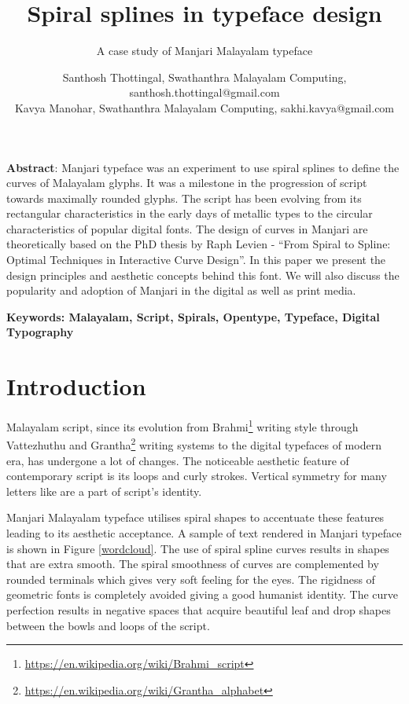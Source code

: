 \documentclass[11pt,twoside,a4paper,parskip=half]{scrartcl}
\title{Spiral splines in typeface design}
\subtitle{A case study of Manjari Malayalam typeface}
\author{%
Santhosh Thottingal, Swathanthra Malayalam Computing, santhosh.thottingal@gmail.com\\
Kavya Manohar, Swathanthra Malayalam Computing, sakhi.kavya@gmail.com
}
\begin{document}
\maketitle

\textbf{Abstract}: Manjari typeface was an experiment to use spiral splines to define the curves of Malayalam glyphs. It was a milestone in the progression of script towards maximally rounded glyphs. The script has been evolving from its rectangular characteristics in the early days of metallic types to the circular characteristics of popular digital fonts. The design of curves in Manjari are theoretically based on the PhD thesis by Raph Levien - ``From Spiral to Spline: Optimal Techniques in Interactive Curve Design”. In this paper we present the design principles and aesthetic concepts behind this font. We will also discuss the popularity and adoption of Manjari in the digital as well as print media.

\textbf{Keywords: Malayalam, Script, Spirals, Opentype, Typeface, Digital Typography}

\section{Introduction}

Malayalam script, since its evolution from Brahmi\footnote{\url{https://en.wikipedia.org/wiki/Brahmi_script}} writing style through Vattezhuthu and Grantha\footnote{\url{https://en.wikipedia.org/wiki/Grantha_alphabet}} writing systems to the digital typefaces of modern era, has undergone a lot of changes. The noticeable aesthetic feature of contemporary script is its loops and curly strokes. Vertical symmetry for many letters like {} are a part of script's identity. 

Manjari Malayalam typeface utilises spiral shapes to accentuate these features leading to its aesthetic acceptance. A sample of text rendered in Manjari typeface is shown in Figure \ref{wordcloud}. The use of spiral spline curves results in shapes that are extra smooth. The spiral smoothness of curves are complemented by rounded terminals which gives very soft feeling for the eyes. The rigidness of geometric fonts is completely avoided giving a good humanist identity. The curve perfection results in negative spaces that acquire beautiful leaf and drop shapes between the bowls and loops of the script. 
\end{document}
